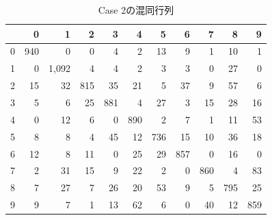 \documentclass[class=jsarticle, crop=false, dvipdfmx, fleqn]{standalone}
\begin{document}
\clearpage
\begin{table}
    \centering
    \caption{Case 2の混同行列}
    \begin{tabular}{|r|rrrrrrrrrr|} \hline
        & 0 & 1 & 2 & 3 & 4 & 5 & 6 & 7 & 8 & 9 \\ \hline
        0 & 940 & 0 & 0 & 4 & 2 & 13 & 9 & 1 & 10 & 1 \\
        1 & 0 & 1,092 & 4 & 4 & 2 & 3 & 3 & 0 & 27 & 0 \\
        2 & 15 & 32 & 815 & 35 & 21 & 5 & 37 & 9 & 57 & 6 \\
        3 & 5 & 6 & 25 & 881 & 4 & 27 & 3 & 15 & 28 & 16 \\
        4 & 0 & 12 & 6 & 0 & 890 & 2 & 7 & 1 & 11 & 53 \\
        5 & 8 & 8 & 4 & 45 & 12 & 736 & 15 & 10 & 36 & 18 \\
        6 & 12 & 8 & 11 & 0 & 25 & 29 & 857 & 0 & 16 & 0 \\
        7 & 2 & 31 & 15 & 9 & 22 & 2 & 0 & 860 & 4 & 83 \\
        8 & 7 & 27 & 7 & 26 & 20 & 53 & 9 & 5 & 795 & 25 \\
        9 & 9 & 7 & 1 & 13 & 62 & 6 & 0 & 40 & 12 & 859 \\
        \hline
    \end{tabular}
    \label{tab:confusion_matrix_case2}
\end{table}
\vspace*{3\baselineskip}
\end{document}
